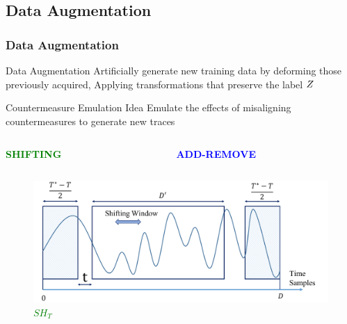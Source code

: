 %


\subsection{Data Augmentation}
\begin{frame}
\frametitle{Data Augmentation}
\begin{small}
\vspace{-11pt}
\begin{block}{Data Augmentation}
Artificially generate new training data by deforming those previously acquired,
Applying transformations that preserve the label $Z$
\end{block}
\vspace{-5pt}
\begin{block}{Countermeasure Emulation Idea}
Emulate the effects of misaligning countermeasures to generate new traces
\begin{columns}
\begin{column}{0.35\textwidth}
\begin{large}
\textbf{\textcolor{green}{SHIFTING}}
\vspace{-8pt}
\end{large}
\end{column}
\begin{column}{0.35\textwidth}
\begin{large}
\textbf{\textcolor{blue}{ADD-REMOVE}}
\vspace{-8pt}
\end{large}
\end{column}
\end{columns}
\begin{figure}
  \begin{minipage}[b]{0.5\linewidth}
    \centering
    \includegraphics[width=\linewidth]{../Figures/CHES2017/Shifting_window.pdf} 
    \caption{\textcolor{green}{$SH_T$}}
  \end{minipage}%
  \begin{minipage}[b]{0.5\linewidth}

\end{minipage}
\end{figure}
\end{block}
\end{small}
\end{frame}
